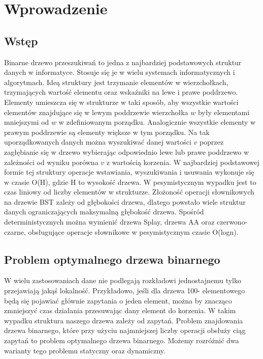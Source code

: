 \documentclass[declaration,shortabstract]{iithesis}
\author         {Julia Majkowska}
\begin{document}

  

\chapter{Wprowadzenie}  

\section{Wstęp}  

Binarne drzewo przeszukiwań to jedna z najbardziej podstawowych struktur danych w informatyce. Stosuje się je w wielu systemach informatycznych i algorytmach. Ideą struktury jest trzymanie elementów w wierzchołkach, trzymających wartość elementu oraz wskaźniki na lewe i prawe poddrzewo. Elementy umieszcza się w strukturze w taki sposób, aby wszystkie wartości elementów znajdujące się w lewym poddrzewie wierzchołka \(w\) były elementami mniejszymi od \(w\) w zdefiniowanym porządku. Analogicznie wszystkie elementy w prawym poddrzewie są elementy większe w tym porządku. Na tak uporządkowanych danych można wyszukiwać danej wartości \(v\) poprzez zagłębianie się w drzewo wybierając odpowiednio lewe lub prawe poddrzewo w zależności od wyniku porówna \(v\) z wartością korzenia. W najbardziej podstawowej formie tej struktury operacje wstawiania, wyszukiwania i usuwania wykonuje się w czasie O(H), gdzie H to wysokość drzewa. W pesymistycznym wypadku jest to czas liniowy od liczby elementów w strukturze. Złożoność operacji słownikowych na drzewie BST zależy od głębokości drzewa, dlatego powstało wiele struktur danych ograniczających maksymalną głębokość drzewa. Spośród deterministycznych można wymienić drzewa Splay, drzewa AA oraz czerwono-czarne, obsługujące operacje słownikowe w pesymistycznym czasie O(logn).  

 

\section{Problem optymalnego drzewa binarnego}  

W wielu zastosowaniach dane nie podlegają rozkładowi jednostajnemu tylko przejawiają jakąś lokalność. Przykładowo, jeśli dla drzewa 100- elementowego będą się pojawiać głównie zapytania o jeden element, można by znacząco zmniejszyć czas działania przesuwając dany element do korzenia. W takim wypadku struktura naszego drzewa zależy od zapytań. Problem znajdowania drzewa binarnego, które przy użyciu najmniejszej liczby operacji obsłuży ciąg zapytań to problem optymalnego drzewa binarnego. Możemy rozróżnić dwa warianty tego problemu statyczny oraz dynamiczny.  
\end{document}
